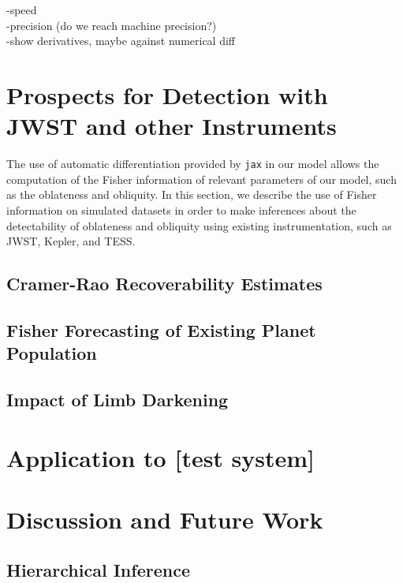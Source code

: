 \documentclass[twocolumn]{aastex631}
\begin{document}
-speed\\
-precision (do we reach machine precision?)\\
-show derivatives, maybe against numerical diff\\
\section{Prospects for Detection with JWST and other Instruments}

The use of automatic differentiation provided by \texttt{jax} in our model allows the computation of the Fisher information of relevant parameters of our model, such as the oblateness and obliquity. In this section, we describe the use of Fisher information on simulated datasets in order to make inferences about the detectability of oblateness and obliquity using existing instrumentation, such as JWST, Kepler, and TESS.


\label{sec:jwstdetect}

\subsection{Cramer-Rao Recoverability Estimates}
\label{sec:rec}

\subsection{Fisher Forecasting of Existing Planet Population}
\label{sec:fisherforecasting}
\subsection{Impact of Limb Darkening}
\section{Application to [test system]}
\label{sec:lctest}
\section{Discussion and Future Work}
\label{disc}
\subsection{Hierarchical Inference}

\end{document}
